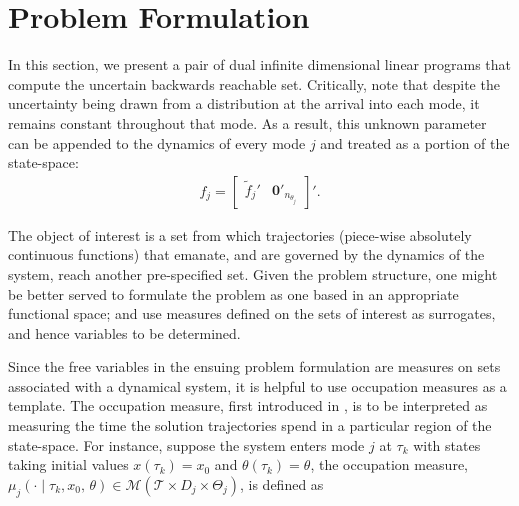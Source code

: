 \section{Problem Formulation}
\label{sec:prob}

In this section, we present a pair of dual infinite dimensional linear programs that compute the uncertain backwards reachable set. 
Critically, note that despite the uncertainty being drawn from a distribution at the arrival into each mode, it remains constant throughout that mode. 
As a result, this unknown parameter can be appended to the dynamics of every mode $j$ and treated as a portion of the state-space:
\begin{align}
f_j=\begin{bmatrix}
  \tilde f_j'&\mathbf{0}'_{n_{\theta_j}}
\end{bmatrix}'.
\end{align}
\par
The object of interest is a set from which trajectories (piece-wise absolutely continuous functions) that emanate, and are governed by the dynamics of the system, reach another pre-specified set. Given the problem structure, one might be better served to formulate the problem as one based in an appropriate functional space; and use measures defined on the sets of interest as surrogates, and hence variables to be determined.
\par
Since the free variables in the ensuing problem formulation are measures on sets associated with a dynamical system, it is helpful to use occupation measures as a template. The occupation measure, first introduced in \cite{Pitman1977}, is to be interpreted as measuring the time the solution trajectories spend in a particular region of the state-space. For instance, suppose the system enters mode $j$ at $\tau_k$ with states taking initial values $x(\tau_k)=x_0$ and $\theta(\tau_k)=\theta$, the occupation measure, \mbox{$\mu_j(\cdot\mid \tau_k,x_0,\,\theta)\in \mathcal M(\mathcal T\times D_j\times \Theta_j)$}, is defined as

